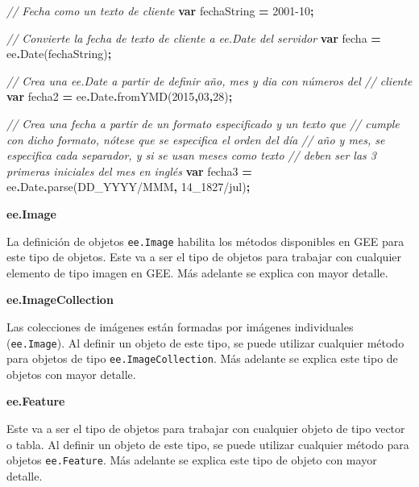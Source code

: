 \documentclass[
  12pt,
  letterpaper,
  twoside]{book}
\newenvironment{Shaded}{\begin{snugshade}}{\end{snugshade}}
\newcommand{\AttributeTok}[1]{\textcolor[rgb]{0.77,0.63,0.00}{#1}}
\newcommand{\CommentTok}[1]{\textcolor[rgb]{0.56,0.35,0.01}{\textit{#1}}}
\newcommand{\DecValTok}[1]{\textcolor[rgb]{0.00,0.00,0.81}{#1}}
\newcommand{\FunctionTok}[1]{\textcolor[rgb]{0.00,0.00,0.00}{#1}}
\newcommand{\KeywordTok}[1]{\textcolor[rgb]{0.13,0.29,0.53}{\textbf{#1}}}
\newcommand{\NormalTok}[1]{#1}
\newcommand{\OperatorTok}[1]{\textcolor[rgb]{0.81,0.36,0.00}{\textbf{#1}}}
\newcommand{\StringTok}[1]{\textcolor[rgb]{0.31,0.60,0.02}{#1}}
\begin{document}
\begin{Shaded}
\begin{Highlighting}[]
\CommentTok{// Fecha como un texto de cliente}
\KeywordTok{var}\NormalTok{ fechaString }\OperatorTok{=} \StringTok{\textquotesingle{}2001{-}10\textquotesingle{}}\OperatorTok{;}

\CommentTok{// Convierte la fecha de texto de cliente a ee.Date del servidor    }
\KeywordTok{var}\NormalTok{ fecha }\OperatorTok{=}\NormalTok{ ee}\OperatorTok{.}\FunctionTok{Date}\NormalTok{(fechaString)}\OperatorTok{;}  

\CommentTok{// Crea una ee.Date a partir de definir año, mes y dia con números del }
\CommentTok{// cliente           }
\KeywordTok{var}\NormalTok{ fecha2 }\OperatorTok{=}\NormalTok{ ee}\OperatorTok{.}\AttributeTok{Date}\OperatorTok{.}\FunctionTok{fromYMD}\NormalTok{(}\DecValTok{2015}\OperatorTok{,}\DecValTok{03}\OperatorTok{,}\DecValTok{28}\NormalTok{)}\OperatorTok{;} 
   
\CommentTok{// Crea una fecha a partir de un formato especificado y un texto que }
\CommentTok{// cumple con dicho formato, nótese que se especifica el orden del día }
\CommentTok{// año y mes, se especifica cada separador, y si se usan meses como texto}
\CommentTok{// deben ser las 3 primeras iniciales del mes en inglés}
\KeywordTok{var}\NormalTok{ fecha3 }\OperatorTok{=}\NormalTok{ ee}\OperatorTok{.}\AttributeTok{Date}\OperatorTok{.}\FunctionTok{parse}\NormalTok{(}\StringTok{\textquotesingle{}DD\_YYYY/MMM\textquotesingle{}}\OperatorTok{,} \StringTok{\textquotesingle{}14\_1827/jul\textquotesingle{}}\NormalTok{)}\OperatorTok{;} 
\end{Highlighting}
\end{Shaded}

\textbf{ee.Image}

La definición de objetos \texttt{ee.Image} habilita los métodos disponibles en GEE para este tipo de objetos. Este va a ser el tipo de objetos para trabajar con cualquier elemento de tipo imagen en GEE. Más adelante se explica con mayor detalle.

\textbf{ee.ImageCollection}

Las colecciones de imágenes están formadas por imágenes individuales (\texttt{ee.Image}). Al definir un objeto de este tipo, se puede utilizar cualquier método para objetos de tipo \texttt{ee.ImageCollection}. Más adelante se explica este tipo de objetos con mayor detalle.

\textbf{ee.Feature}

Este va a ser el tipo de objetos para trabajar con cualquier objeto de tipo vector o tabla. Al definir un objeto de este tipo, se puede utilizar cualquier método para objetos \texttt{ee.Feature}. Más adelante se explica este tipo de objeto con mayor detalle.
\end{document}
